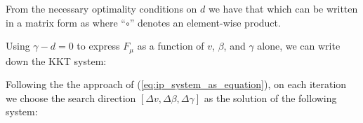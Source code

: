 \documentclass[11pt,letterpaper]{article}
\numberwithin{equation}{section} %
\numberwithin{figure}{section} %
\numberwithin{table}{section} %
\begin{document}

From the necessary optimality conditions on $d$ we have that 
which can be written in a matrix form as 
where ``$\circ$'' denotes an element-wise product.

Using $\gamma - d = 0$ to express $F_\mu$ as a function of $v$, $\beta$, and $\gamma$ alone, we can write down the KKT system:

Following the the approach of (\ref{eq:ip_system_as_equation}), on each iteration we choose the search direction $[\Delta v, \Delta \beta, \Delta \gamma]$ as the solution of the following system:

\end{document}
